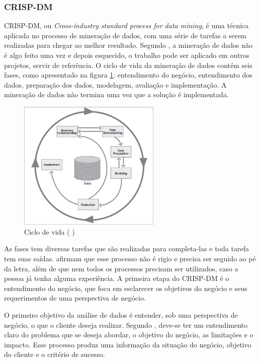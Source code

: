 \subsubsection{CRISP-DM}
CRISP-DM, ou\textit{ Cross-industry standard process for data mining}, é uma técnica aplicada no processo de mineração de dados, com uma série de tarefas a serem realizadas para chegar ao melhor resultado.
Segundo , a mineração de dados não é algo feito uma vez e depois esquecido, o trabalho pode ser aplicado em outros projetos, servir de referência.
O ciclo de vida da mineração de dados contém seis fases, como apresentado na figura \ref{crispcycle}: entendimento do negócio, entendimento dos dados, preparação dos dados, modelagem, avaliação e implementação. 
A mineração de dados não termina uma vez que a solução é implementada.
\begin{figure}[H]
\centering
\includegraphics[height=6.2cm]{imagens/lifecycle.png}
\caption{Ciclo de vida (\citeauthor{crispmanual} \citeyear{crispmanual})}
\label{crispcycle}
\end{figure}
As fases tem diversas tarefas que são realizadas para completa-las e toda tarefa tem suas saídas.  afirmam que esse processo não é rigio e precisa ser seguido ao pé da letra, além de que nem todos os processos precisam ser utilizados, caso a pessoa já tenha alguma experiência.
A primeira etapa do CRISP-DM é o entendimento do negócio, que foca em esclarecer os objetivos do negócio e seus requerimentos de uma perspectiva de negócio.

O primeiro objetivo da análise de dados é entender, sob uma perspectiva de negócio, o que o cliente deseja realizar. Segundo , deve-se ter um entendimento claro do problema que se deseja abordar, o objetivo do negócio, as limitações e o impacto. Esse processo produz uma informação da situação do negócio, objetivo do cliente e o critério de sucesso.

